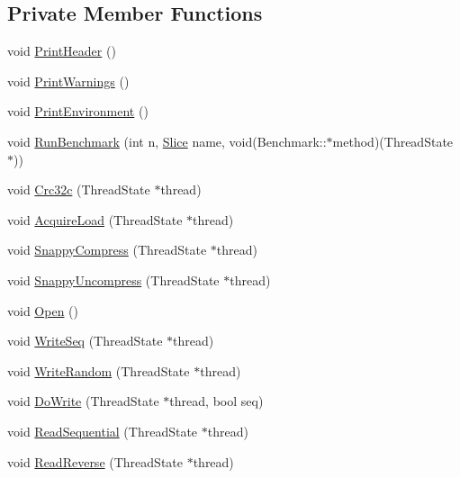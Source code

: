 \subsection*{Private Member Functions}
\begin{DoxyCompactItemize}
\item 
void \hyperlink{classleveldb_1_1_benchmark_a15b286cc29560860abc89217e4b5c079}{Print\+Header} ()
\item 
void \hyperlink{classleveldb_1_1_benchmark_aa0b2a30493347ff50cbf28772cfaca9d}{Print\+Warnings} ()
\item 
void \hyperlink{classleveldb_1_1_benchmark_ac99c8911fbe6bc43acd785cf28d3f5a7}{Print\+Environment} ()
\item 
void \hyperlink{classleveldb_1_1_benchmark_a925609f12a05da14b1a87dc2598807b3}{Run\+Benchmark} (int n, \hyperlink{classleveldb_1_1_slice}{Slice} name, void(Benchmark\+::$\ast$method)(Thread\+State $\ast$))
\item 
void \hyperlink{classleveldb_1_1_benchmark_a478a2b11b7abd9d2494f7530e2e7268c}{Crc32c} (Thread\+State $\ast$thread)
\item 
void \hyperlink{classleveldb_1_1_benchmark_abb3ed8c5bc47a8d9b6ad5df6e4df26e3}{Acquire\+Load} (Thread\+State $\ast$thread)
\item 
void \hyperlink{classleveldb_1_1_benchmark_ae48a1dd37ddecfbf010fc132a51c0709}{Snappy\+Compress} (Thread\+State $\ast$thread)
\item 
void \hyperlink{classleveldb_1_1_benchmark_a5766c8168580e22b65f3e30893d8acb4}{Snappy\+Uncompress} (Thread\+State $\ast$thread)
\item 
void \hyperlink{classleveldb_1_1_benchmark_a89a3b0da75e6cd2ffb879358e5dd82a6}{Open} ()
\item 
void \hyperlink{classleveldb_1_1_benchmark_ad0ec88def6560d587b42466f7cfef39c}{Write\+Seq} (Thread\+State $\ast$thread)
\item 
void \hyperlink{classleveldb_1_1_benchmark_a578f83feb70b8f5530557fd64da62e0c}{Write\+Random} (Thread\+State $\ast$thread)
\item 
void \hyperlink{classleveldb_1_1_benchmark_a5791c3802a3ce7284073db7c4ca040e6}{Do\+Write} (Thread\+State $\ast$thread, bool seq)
\item 
void \hyperlink{classleveldb_1_1_benchmark_ace2f012f8ce6e279f900045c94934d7a}{Read\+Sequential} (Thread\+State $\ast$thread)
\item 
void \hyperlink{classleveldb_1_1_benchmark_a0ff7ac14f7503672fd09a23f8cb9c171}{Read\+Reverse} (Thread\+State $\ast$thread)

\end{DoxyCompactItemize}

